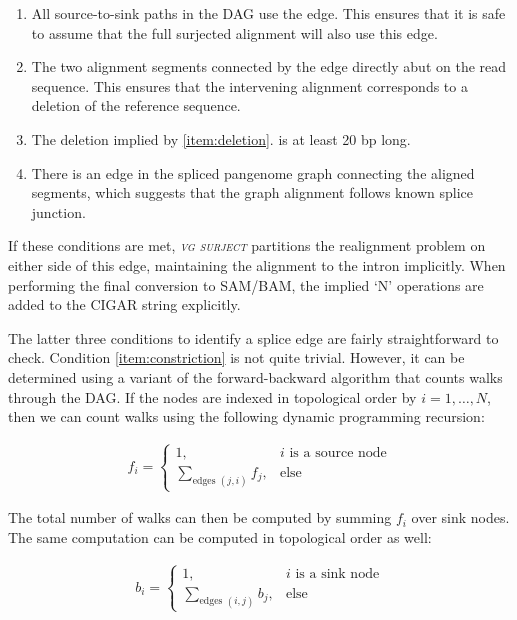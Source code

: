 \documentclass[11pt]{ucthesis}
\newcommand{\tool}[1]{\emph{\textsc{#1}}}
\begin{document}
\begin{enumerate}
\item All source-to-sink paths in the DAG use the edge. This ensures that it is safe to assume that the full surjected alignment will also use this edge. \label{item:constriction}
\item The two alignment segments connected by the edge directly abut on the read sequence. This ensures that the intervening alignment corresponds to a deletion of the reference sequence. \label{item:deletion}
\item The deletion implied by \ref{item:deletion}. is at least 20 bp long.
\item There is an edge in the spliced pangenome graph connecting the aligned segments, which suggests that the graph alignment follows known splice junction.
\end{enumerate}

\noindent If these conditions are met, \tool{vg surject} partitions the realignment problem on either side of this edge, maintaining the alignment to the intron implicitly. When performing the final conversion to SAM/BAM, the implied `N' operations are added to the CIGAR string explicitly.

The latter three conditions to identify a splice edge are fairly straightforward to check. Condition \ref{item:constriction} is not quite trivial. However, it can be determined using a variant of the forward-backward algorithm that counts walks through the DAG. If the nodes are indexed in topological order by $i = 1,\ldots,N$, then we can count walks using the following dynamic programming recursion:

\begin{align}
f_i = \begin{cases}
1,& i\text{ is a source node} \\
\sum_{\text{edges }(j,i)}f_j,& \text{else}
\end{cases}
\end{align}

\noindent The total number of walks can then be computed by summing $f_i$ over sink nodes. The same computation can be computed in topological order as well:

\begin{align}
b_i = \begin{cases}
1,& i\text{ is a sink node} \\
\sum_{\text{edges }(i,j)}b_j,& \text{else}
\end{cases}
\end{align}
\end{document}
